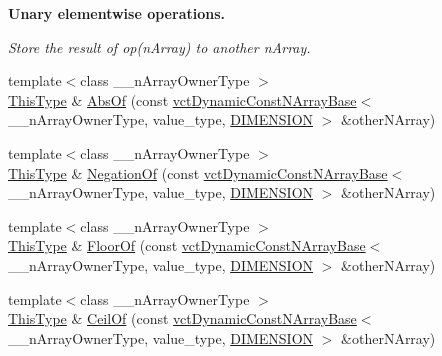 \begin{Indent}{\bf Unary elementwise operations.}\par
{\em Store the result of op(n\-Array) to another n\-Array. }\begin{DoxyCompactItemize}
\item 
{\footnotesize template$<$class \-\_\-\-\_\-n\-Array\-Owner\-Type $>$ }\\\hyperlink{classvct_dynamic_const_n_array_base_a5123caffcf1455a1b99003877eade897}{This\-Type} \& \hyperlink{classvct_dynamic_n_array_base_a30fb32bc1fbca7bccf98549277320044}{Abs\-Of} (const \hyperlink{classvct_dynamic_const_n_array_base}{vct\-Dynamic\-Const\-N\-Array\-Base}$<$ \-\_\-\-\_\-n\-Array\-Owner\-Type, value\-\_\-type, \hyperlink{classvct_dynamic_n_array_base_aa66532d28588bdf26d08fb593db815d6abfcde386ec801b212d7c42d63a4f3837}{D\-I\-M\-E\-N\-S\-I\-O\-N} $>$ \&other\-N\-Array)
\item 
{\footnotesize template$<$class \-\_\-\-\_\-n\-Array\-Owner\-Type $>$ }\\\hyperlink{classvct_dynamic_const_n_array_base_a5123caffcf1455a1b99003877eade897}{This\-Type} \& \hyperlink{classvct_dynamic_n_array_base_a9c13418c002b516901736f04372dda45}{Negation\-Of} (const \hyperlink{classvct_dynamic_const_n_array_base}{vct\-Dynamic\-Const\-N\-Array\-Base}$<$ \-\_\-\-\_\-n\-Array\-Owner\-Type, value\-\_\-type, \hyperlink{classvct_dynamic_n_array_base_aa66532d28588bdf26d08fb593db815d6abfcde386ec801b212d7c42d63a4f3837}{D\-I\-M\-E\-N\-S\-I\-O\-N} $>$ \&other\-N\-Array)
\item 
{\footnotesize template$<$class \-\_\-\-\_\-n\-Array\-Owner\-Type $>$ }\\\hyperlink{classvct_dynamic_const_n_array_base_a5123caffcf1455a1b99003877eade897}{This\-Type} \& \hyperlink{classvct_dynamic_n_array_base_a3963f50326be7a30133898aef20e7ab0}{Floor\-Of} (const \hyperlink{classvct_dynamic_const_n_array_base}{vct\-Dynamic\-Const\-N\-Array\-Base}$<$ \-\_\-\-\_\-n\-Array\-Owner\-Type, value\-\_\-type, \hyperlink{classvct_dynamic_n_array_base_aa66532d28588bdf26d08fb593db815d6abfcde386ec801b212d7c42d63a4f3837}{D\-I\-M\-E\-N\-S\-I\-O\-N} $>$ \&other\-N\-Array)
\item 
{\footnotesize template$<$class \-\_\-\-\_\-n\-Array\-Owner\-Type $>$ }\\\hyperlink{classvct_dynamic_const_n_array_base_a5123caffcf1455a1b99003877eade897}{This\-Type} \& \hyperlink{classvct_dynamic_n_array_base_aab97377ed3f9ef2de202add75ab7ffff}{Ceil\-Of} (const \hyperlink{classvct_dynamic_const_n_array_base}{vct\-Dynamic\-Const\-N\-Array\-Base}$<$ \-\_\-\-\_\-n\-Array\-Owner\-Type, value\-\_\-type, \hyperlink{classvct_dynamic_n_array_base_aa66532d28588bdf26d08fb593db815d6abfcde386ec801b212d7c42d63a4f3837}{D\-I\-M\-E\-N\-S\-I\-O\-N} $>$ \&other\-N\-Array)
\end{DoxyCompactItemize}
\end{Indent}

